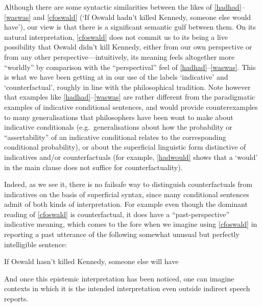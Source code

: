 \documentclass[If.tex]{subfiles}
\begin{document}
Although there are some syntactic similarities between the likes of \ref{hadhad}--\ref{waswas} and \ref{cfoswald} (‘If Oswald hadn't killed Kennedy, someone else would have’), our view is that there is a significant semantic gulf between them. On its natural interpretation, \ref{cfoswald} does not commit us to its being a live possibility that Oswald didn't kill Kennedy, either from our own perspective or from any other perspective---intuitively, its meaning feels altogether more “worldly” by comparison with the “perspectival” feel of \ref{hadhad}--\ref{waswas}. This is what we have been getting at in our use of the labels ‘indicative’ and ‘counterfactual’, roughly in line with the philosophical tradition. Note however that examples like \ref{hadhad}--\ref{waswas} are rather different from the paradigmatic examples of indicative conditional sentences, and would provide counterexamples to many generalisations that philosophers have been wont to make about indicative conditionals (e.g.~generalisations about how the probability or “assertability” of an indicative conditional relates to the corresponding conditional probability), or about the superficial linguistic form distinctive of indicatives and/or counterfactuals (for example, \ref{hadwould} shows that a ‘would’ in the main clause does not suffice for counterfactuality).

Indeed, as we see it, there is no failsafe way to distinguish counterfactuals from indicatives on the basis of superficial syntax, since many conditional sentences admit of both kinds of interpretation. For example even though the dominant reading of \ref{cfoswald} is counterfactual, it does have a “past-perspective” indicative meaning, which comes to the fore when we imagine using \ref{cfoswald} in reporting a past utterance of the following somewhat unusual but perfectly intelligible sentence:
\begin{prop}
	If Oswald hasn't killed Kennedy, someone else will have 
\end{prop}
And once this epistemic interpretation has been noticed, one can imagine contexts in which it is the intended interpretation even outside indirect speech reports.
\end{document}
